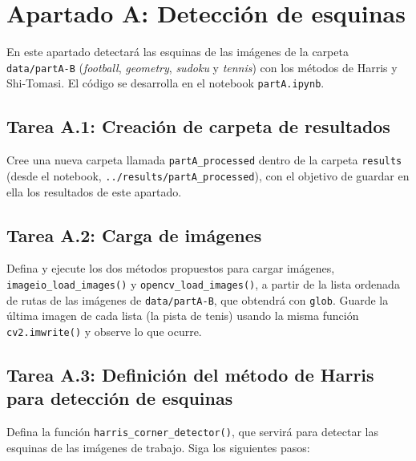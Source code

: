 \chapter{Apartado A: \textbf{Detección de esquinas}}
\label{chapter:tarea_a}

En este apartado detectará las esquinas de las imágenes de la carpeta \texttt{data/partA-B} (\textit{football}, \textit{geometry}, \textit{sudoku} y \textit{tennis}) con los métodos de Harris y Shi-Tomasi. El código se desarrolla en el notebook \texttt{partA.ipynb}.

\section*{Tarea A.1: Creación de carpeta de resultados}
{}

Cree una nueva carpeta llamada \texttt{partA\_processed} dentro de la carpeta \texttt{results} (desde el notebook, \texttt{../results/partA\_processed}), con el objetivo de guardar en ella los resultados de este apartado.

\section*{Tarea A.2: Carga de imágenes}
{}

Defina y ejecute los dos métodos propuestos para cargar imágenes, \texttt{imageio\_load\_images()} y \texttt{opencv\_load\_images()}, a partir de la lista ordenada de rutas de las imágenes de \texttt{data/partA-B}, que obtendrá con \texttt{glob}. Guarde la última imagen de cada lista (la pista de tenis) usando la misma función \texttt{cv2.imwrite()} y observe lo que ocurre.

\section*{Tarea A.3: Definición del método de Harris para detección de esquinas}
{}

Defina la función \texttt{harris\_corner\_detector()}, que servirá para detectar las esquinas de las imágenes de trabajo. Siga los siguientes pasos:

